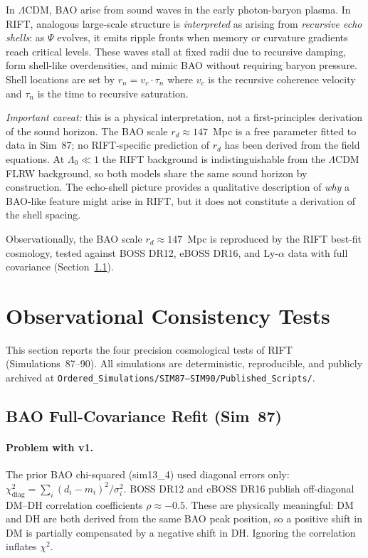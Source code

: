 \documentclass[12pt,a4paper]{article}
\begin{document}
In $\Lambda$CDM, BAO arise from sound waves in the early photon-baryon plasma.
In RIFT, analogous large-scale structure is \emph{interpreted} as arising from
\emph{recursive echo shells}: as $\Psi$ evolves, it emits ripple fronts when
memory or curvature gradients reach critical levels. These waves stall at fixed
radii due to recursive damping, form shell-like overdensities, and mimic BAO
without requiring baryon pressure. Shell locations are set by
$r_n = v_c \cdot \tau_n$ where $v_c$ is the recursive coherence velocity and
$\tau_n$ is the time to recursive saturation.

\emph{Important caveat:} this is a physical interpretation, not a
first-principles derivation of the sound horizon.  The BAO scale
$r_d \approx 147$~Mpc is a free parameter fitted to data in Sim~87;
no RIFT-specific prediction of $r_d$ has been derived from the field equations.
At $\Lambda_0 \ll 1$ the RIFT background is indistinguishable from the
$\Lambda$CDM FLRW background, so both models share the same sound horizon
by construction.  The echo-shell picture provides a qualitative description
of \emph{why} a BAO-like feature might arise in RIFT, but it does not
constitute a derivation of the shell spacing.

Observationally, the BAO scale $r_d \approx 147$~Mpc is reproduced by the
RIFT best-fit cosmology, tested against BOSS DR12, eBOSS DR16, and Ly-$\alpha$
data with full covariance (Section~\ref{sec:obs_bao}).

\section{Observational Consistency Tests}
\label{sec:observations}

This section reports the four precision cosmological tests of RIFT
(Simulations~87--90). All simulations are deterministic, reproducible, and
publicly archived at
\texttt{Ordered\_Simulations/SIM87--SIM90/Published\_Scripts/}.

\subsection{BAO Full-Covariance Refit (Sim~87)}
\label{sec:obs_bao}

\paragraph{Problem with v1.} The prior BAO chi-squared (sim13\_4) used
diagonal errors only:
$\chi^2_{\mathrm{diag}} = \sum_i (d_i - m_i)^2 / \sigma_i^2$.
BOSS DR12 and eBOSS DR16 publish off-diagonal DM--DH correlation coefficients
$\rho \approx -0.5$. These are physically meaningful: DM and DH are both derived
from the same BAO peak position, so a positive shift in DM is partially compensated
by a negative shift in DH. Ignoring the correlation inflates $\chi^2$.
\end{document}
